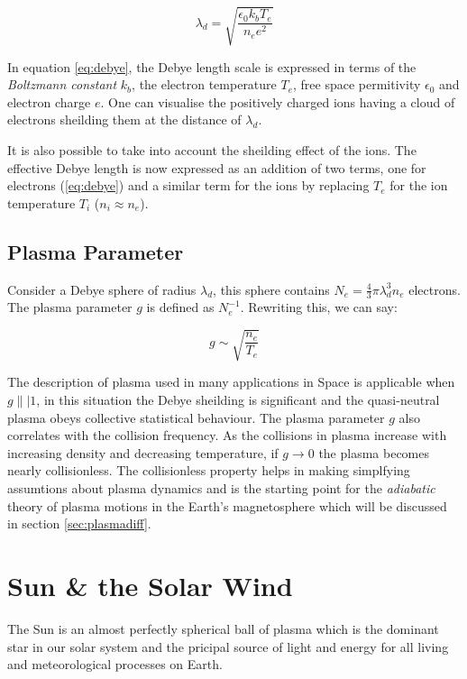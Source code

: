 \begin{equation}\label{eq:debye}
    \lambda_d = \sqrt{\frac{\epsilon_0 k_b T_e}{n_e e^2}}
\end{equation}

In equation \ref{eq:debye}, the Debye length scale is expressed in terms of the \emph{Boltzmann constant} $k_b$, 
the electron temperature $T_e$, free space permitivity $\epsilon_0$ and electron charge $e$. One can visualise the 
positively charged ions having a cloud of electrons sheilding them at the distance of $\lambda_d$. 

It is also possible to take into account the sheilding effect of the ions. The effective Debye length is now 
expressed as an addition of two terms, one for electrons (\ref{eq:debye}) and a similar term for the ions by replacing 
$T_e$ for the ion temperature $T_i$ ($n_i \approx n_e$). 

\subsection*{Plasma Parameter}

Consider a Debye sphere of radius $\lambda_d$, this sphere contains $N_e = \frac{4}{3}\pi \lambda^3_d n_e$ electrons. The 
plasma parameter $g$ is defined as $N_{e}^{-1}$. Rewriting this, we can say:

\begin{equation}
    g \sim \sqrt{\frac{n_e}{T_e}}
\end{equation}

The description of plasma used in many applications in Space is applicable when $g \|| 1$, in this situation 
the Debye sheilding is significant and the quasi-neutral plasma obeys collective statistical behaviour. 
The plasma parameter $g$ also correlates with the collision frequency. As the collisions in plasma increase 
with increasing density and decreasing temperature, if $g \longrightarrow 0$ the plasma becomes nearly collisionless. The collisionless property helps in making simplfying assumtions about plasma dynamics and is the starting point 
for the \emph{adiabatic} theory of plasma motions in the Earth's magnetosphere which will be discussed in section 
\ref{sec:plasmadiff}.

\section{Sun \& the Solar Wind}\label{sec:solar}

The Sun is an almost perfectly spherical ball of plasma which is the dominant star in our solar system and 
the pricipal source of light and energy for all living and meteorological processes on Earth.

